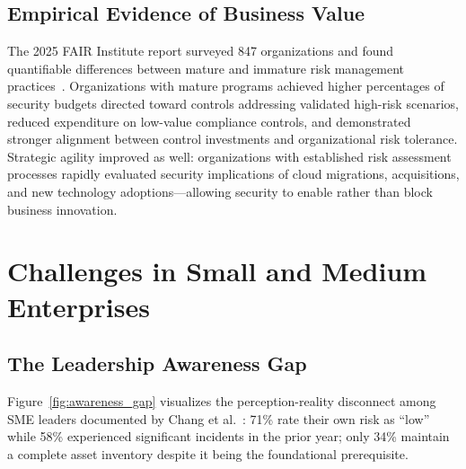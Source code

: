 \documentclass[journal]{IEEEtran}
\begin{document}
\subsection{Empirical Evidence of Business Value}

The 2025 FAIR Institute report surveyed 847 organizations and found quantifiable
differences between mature and immature risk management practices~\cite{fairinstitute2025}.
Organizations with mature programs achieved higher percentages of security budgets directed
toward controls addressing validated high-risk scenarios, reduced expenditure on low-value
compliance controls, and demonstrated stronger alignment between control investments and
organizational risk tolerance. Strategic agility improved as well: organizations with
established risk assessment processes rapidly evaluated security implications of cloud
migrations, acquisitions, and new technology adoptions---allowing security to enable
rather than block business innovation.

\section{Challenges in Small and Medium Enterprises}

\subsection{The Leadership Awareness Gap}

Figure~\ref{fig:awareness_gap} visualizes the perception-reality disconnect among SME
leaders documented by Chang et al.~\cite{chang2025mind}: 71\% rate their own risk as
``low'' while 58\% experienced significant incidents in the prior year; only 34\%
maintain a complete asset inventory despite it being the foundational prerequisite.
\end{document}
